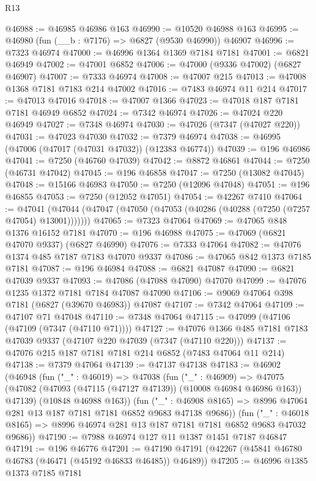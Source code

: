 \begin{lexlean}{R13}
\begin{coremodule}
@46988 := @46985 @46986 @163
@46990 := @10520 @46988 @163
@46995 := @46980 (fun (__b : @7176) => @6827 (@9530 @46990)) @46907
@46996 := @7323 @46974
@47000 := @46996 @1364 @1369 @7184 @7181
@47001 := @6821 @46949
@47002 := @47001 @6852
@47006 := @47000 (@9336 @47002) (@6827 @46907)
@47007 := @7333 @46974
@47008 := @47007 @215
@47013 := @47008 @1368 @7181 @7183 @214 @47002
@47016 := @7483 @46974 @11 @214
@47017 := @47013 @47016
@47018 := @47007 @1366
@47023 := @47018 @187 @7181 @7181 @46949 @6852
@47024 := @7342 @46974
@47026 := @47024 @220 @46949
@47027 := @7348 @46974
@47030 := @47026 (@7347 (@47027 @220))
@47031 := @47023 @47030
@47032 := @7379 @46974
@47038 := @46995 (@47006 (@47017 (@47031 @47032)) (@12383 @46774))
@47039 := @196 @46986
@47041 := @7250 (@46760 @47039)
@47042 := @8872 @46861
@47044 := @7250 (@46731 @47042)
@47045 := @196 @46858
@47047 := @7250 (@13082 @47045)
@47048 := @15166 @46983
@47050 := @7250 (@12096 @47048)
@47051 := @196 @46855
@47053 := @7250 (@12052 @47051)
@47054 := @42267 @7410
@47064 := @47041 (@47044 (@47047 (@47050 (@47053 (@40286 (@40288 (@7250 (@7257 @47054) @13001)))))))
@47065 := @7323 @47064
@47069 := @47065 @848 @1376 @16152 @7181
@47070 := @196 @46988
@47075 := @47069 (@6821 @47070 @9337) (@6827 @46990)
@47076 := @7333 @47064
@47082 := @47076 @1374 @485 @7187 @7183 @47070 @9337
@47086 := @47065 @842 @1373 @7185 @7181
@47087 := @196 @46984
@47088 := @6821 @47087
@47090 := @6821 @47039 @9337
@47093 := @47086 (@47088 @47090) @47070
@47099 := @47076 @1235 @1372 @7181 @7184 @47087 @47090
@47106 := @9069 @47064 @398 @7181 (@6827 (@39670 @46983)) @47087
@47107 := @7342 @47064
@47109 := @47107 @71 @47048
@47110 := @7348 @47064
@47115 := @47099 (@47106 (@47109 (@7347 (@47110 @71))))
@47127 := @47076 @1366 @485 @7181 @7183 @47039 @9337 (@47107 @220 @47039 (@7347 (@47110 @220)))
@47137 := @47076 @215 @187 @7181 @7181 @214 @6852 (@7483 @47064 @11 @214)
@47138 := @7379 @47064
@47139 := @47137 @47138
@47183 := @46902
    (@46948
      (fun ("_" : @46019) =>
      @47038
        (fun ("_" : @46909) =>
        @47075
          (@47082 (@47093 (@47115 (@47127 @47139)) (@10008 @46984 @46986 @163)) @47139)
          (@10848 @46988 @163))
        (fun ("_" : @46908 @8165) =>
        @8996 @47064 @281 @13 @187 @7181 @7181 @6852 @9683 @47138 @9686))
      (fun ("_" : @46018 @8165) => @8996 @46974 @281 @13 @187 @7181 @7181 @6852 @9683 @47032 @9686))
@47190 := @7988 @46974 @127 @11 @1387 @1451 @7187 @46847
@47191 := @196 @46776
@47201 := @47190 @47191 (@42267 (@45841 @46780 @46783 (@46471 (@45192 @46833 @46485)) @46489))
@47205 := @46996 @1385 @1373 @7185 @7181

\end{coremodule}
\end{lexlean}
